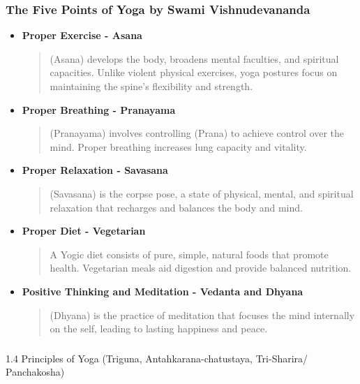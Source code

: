 \begin{frame}[fragile]\frametitle{The Five Points of Yoga by Swami Vishnudevananda}
    \begin{itemize}
        \item \textbf{Proper Exercise - Asana}
            \begin{quote}
             (Asana) develops the body, broadens mental faculties, and spiritual capacities. Unlike violent physical exercises, yoga postures focus on maintaining the spine’s flexibility and strength.
            \end{quote}
        \item \textbf{Proper Breathing - Pranayama}
            \begin{quote}
             (Pranayama) involves controlling  (Prana) to achieve control over the mind. Proper breathing increases lung capacity and vitality.
            \end{quote}
        \item \textbf{Proper Relaxation - Savasana}
            \begin{quote}
             (Savasana) is the corpse pose, a state of physical, mental, and spiritual relaxation that recharges and balances the body and mind.
            \end{quote}
        \item \textbf{Proper Diet - Vegetarian}
            \begin{quote}
            A Yogic diet consists of pure, simple, natural foods that promote health. Vegetarian meals aid digestion and provide balanced nutrition.
            \end{quote}
        \item \textbf{Positive Thinking and Meditation - Vedanta and Dhyana}
            \begin{quote}
             (Dhyana) is the practice of meditation that focuses the mind internally on the self, leading to lasting happiness and peace.
            \end{quote}
    \end{itemize}
\end{frame}


\begin{frame}[fragile]\frametitle{}
\begin{center}
{\Large 1.4 Principles of Yoga (Triguna, Antahkarana-chatustaya, Tri-Sharira/ Panchakosha)}
\end{center}
\end{frame}

